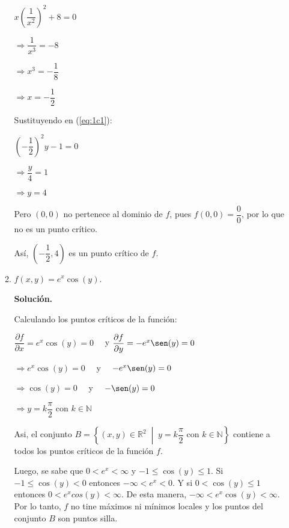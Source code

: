 \documentclass[fleqn, 12pt]{article}
\newcommand{\derivadaparcial}[2]{\dfrac{\partial {#1}}{\partial {#2}}}
\newcommand{\talque}{\; \middle | \;}
\begin{document}
\begin{enumerate}
\begin{enumerate}
            $ x \left( \dfrac{1}{x^2} \right)^2 + 8 = 0 $

            $ \Longrightarrow \dfrac{1}{x^3} = -8 $

            $ \Longrightarrow x^3 = -\dfrac{1}{8} $

            $ \Longrightarrow x = -\dfrac{1}{2} $

            Sustituyendo en (\ref{eq:1c1}): 

            $ \left( -\dfrac{1}{2} \right)^2 y - 1 = 0 $

            $ \Longrightarrow \dfrac{y}{4} = 1 $

            $ \Longrightarrow y = 4 $

            Pero $ (0,0) $ no pertenece al dominio de $ f $, pues $ f(0,0) = \dfrac{0}{0} $, por lo que no es un punto crítico.

            Así, $ \left( -\dfrac{1}{2}, 4 \right) $ es un punto crítico de $ f $.

            \item $ f(x,y) = e^x \cos (y) $.
            
            \textbf{Solución.}

            Calculando los puntos críticos de la función:

            $ \derivadaparcial{f}{x} = e^x \cos (y) = 0 \quad $ y $ \derivadaparcial{f}{y} = -e^x \sen (y) = 0 $

            $ \Longrightarrow e^x \cos (y) = 0 \quad $ y $ \quad -e^x \sen (y) = 0 $

            $ \Longrightarrow \cos (y) = 0 \quad $ y $ \quad - \sen (y) = 0 $

            $ \Longrightarrow y = k \dfrac{\pi}{2} $ con $ k \in \mathbb{N} $

            Asi, el conjunto $ B = \left\lbrace (x,y) \in \mathbb{R}^2 \talque y = k \dfrac{\pi}{2} \text{ con } k \in \mathbb{N} \right\rbrace $ contiene a todos los puntos críticos de la función $ f $.

            Luego, se sabe que $ 0 < e^x < \infty $ y $ -1 \leq \cos (y) \leq 1 $. Si $ -1 \leq \cos (y) < 0 $ entonces $ - \infty < e^x < 0 $. Y si $ 0 < \cos (y) \leq 1 $ entonces $ 0 < e^x cos(y) < \infty $. De esta manera, $ - \infty < e^x \cos (y) < \infty $. Por lo tanto, $ f $ no tine máximos ni mínimos locales y los puntos del conjunto $ B $ son puntos silla.


\end{enumerate}
\end{enumerate}
\end{document}

